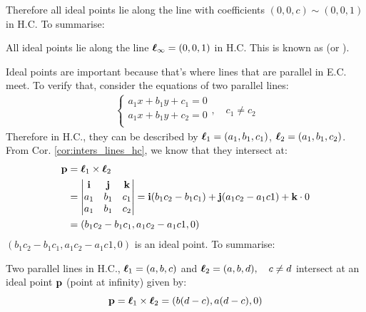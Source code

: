 \documentclass[a4paper]{article}
\begin{document}
Therefore all ideal points lie along the line with coefficients $(0,0,c) \sim (0,0,1)$ in H.C. To summarise:
\begin{corollary}
All ideal points lie along the line $\boldsymbol{\ell}_{\infty} = (0,0,1)$ in H.C. This is known as  (or ).
\end{corollary}
Ideal points are important because that's where lines that are parallel in E.C. meet. To verify that, consider the equations of two parallel lines:
\begin{align*}
\left\{ 
\begin{matrix}
a_1x + b_1y + c_1 = 0\\
a_1x + b_1y + c_2 = 0 \\
\end{matrix}, \quad c_1 \neq c_2
\right.
\label{eq:2parallel_lines_ec}
\end{align*}
Therefore in H.C., they can be described by $\boldsymbol{\ell}_1 = (a_1, b_1, c_1)$, $\boldsymbol{\ell}_2 = (a_1, b_1, c_2)$. From Cor. \ref{cor:inters_lines_hc}, we know that they intersect at:
\begin{align*}
\textbf{p} &= \boldsymbol{\ell}_1 \times \boldsymbol{\ell}_2 \\  
&= \left|
\begin{matrix}
\textbf{i} & \textbf{j} & \textbf{k} \\
a_1 & b_1 & c_1 \\
a_1 & b_1 & c_2
\end{matrix}
\right| = \textbf{i} (b_1c_2 - b_1c_1) + \textbf{j} (a_1c_2 - a_1c1) + \textbf{k}\cdot 0 \\
&= (b_1c_2 - b_1c_1, a_1c_2 - a_1c1, 0)
\end{align*}
$(b_1c_2 - b_1c_1, a_1c_2 - a_1c1, 0)$ is an ideal point. To summarise:

\begin{corollary}
Two parallel lines in H.C., $\boldsymbol{\ell}_1 = (a, b, c)$ and $\boldsymbol{\ell}_2 = (a, b, d), \quad c \neq d$ intersect at an ideal point $\textbf{\textup{p}}$ (point at infinity) given by:
\begin{equation}
    \textbf{\textup{p}} = \boldsymbol{\ell}_1 \times \boldsymbol{\ell}_2 = (b(d-c), a(d-c), 0)
\end{equation}
\end{corollary}
\end{document}
